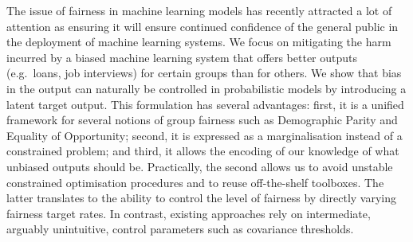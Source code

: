 %
The issue of fairness in machine learning models has recently attracted a lot of attention as ensuring it will ensure continued confidence of the general public in the deployment of machine learning systems.
We focus on mitigating the harm incurred by a biased machine learning system
that offers better outputs (e.g.\ loans, job interviews) for certain groups than for others.
We show that bias in the output can naturally be controlled in probabilistic models
by introducing a latent target output. 
This formulation has several advantages:
first, it is a unified framework for several notions of group fairness such as Demographic Parity and Equality of Opportunity;
second, it is expressed as a marginalisation instead of a constrained problem;
and third, it allows the encoding of our knowledge of what unbiased outputs should be.
%
Practically, the second allows us to avoid unstable constrained optimisation procedures and to reuse off-the-shelf toolboxes.
%
The latter translates to the ability to control the level of fairness by
directly varying fairness target rates. %
In contrast, existing approaches rely on intermediate, arguably unintuitive, control parameters such as covariance thresholds.


